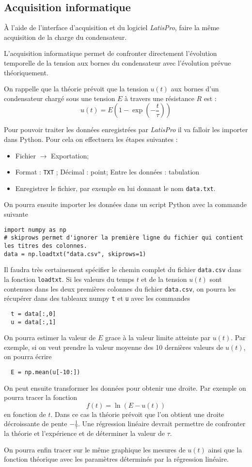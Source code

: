 \documentclass{tp}
\begin{document}
\subsection{Acquisition informatique} 
\`A l'aide de l'interface d'acquisition et du logiciel \emph{LatisPro}, faire la même acquisition de la charge du condensateur.

L'acquisition informatique permet de confronter directement l'évolution temporelle de la tension aux bornes du condensateur avec l'évolution prévue théoriquement. 

On rappelle que la théorie prévoit que la tension $u(t)$ aux bornes d'un condensateur chargé sous une tension $E$ à travers une résistance $R$ est :
\begin{equation}
	u(t)=E\left(1-\exp\left(-\frac t\tau\right)\right)
\end{equation}

Pour pouvoir traiter les données enregistrées par \emph{LatisPro} il va falloir les importer dans Python. Pour cela on effectuera les étapes suivantes : 
\begin{itemize}
  \item Fichier $\rightarrow$ Exportation;
  \item Format : \texttt{TXT} ; Décimal : point;  Entre les données : tabulation
  \item Enregistrer le fichier, par exemple en lui donnant le nom \texttt{data.txt}.
\end{itemize}

On pourra ensuite importer les données dans un script Python avec la commande suivante
\begin{verbatim}
import numpy as np
# skiprows permet d'ignorer la première ligne du fichier qui contient les titres des colonnes.
data = np.loadtxt("data.csv", skiprows=1)
\end{verbatim}
Il faudra très certainement spécifier le chemin complet du fichier \texttt{data.csv} dans la fonction \texttt{loadtxt}.
Si les valeurs du temps $t$ et de la tension $u(t)$ sont contenues dans les deux premières colonnes du fichier \texttt{data.csv}, on pourra les récupérer dans des tableaux numpy \texttt{t} et \texttt{u} avec les commandes
\begin{verbatim}
  t = data[:,0]
  u = data[:,1]
\end{verbatim}

On pourra estimer la valeur de $E$ grace à la valeur limite atteinte par $u(t)$. Par exemple, si on veut prendre la valeur moyenne des 10 dernières valeurs de $u(t)$, on pourra écrire
\begin{verbatim}
  E = np.mean(u[-10:])
\end{verbatim}
On peut ensuite transformer les données pour obtenir une droite. Par exemple on pourra tracer la fonction
\begin{equation}
  f(t) = \ln(E-u(t)) 
\end{equation}
en fonction de $t$. Dans ce cas la théorie prévoit que l'on obtient une droite décroissante de pente $-\frac{1}{\tau}$. Une régression linéaire devrait permettre de confronter la théorie et l'expérience et de déterminer la valeur de $\tau$.   

On pourra enfin tracer sur le même graphique les mesures de $u(t)$ ainsi que la fonction théorique avec les paramètres déterminés par la régression linéaire.
\end{document}
